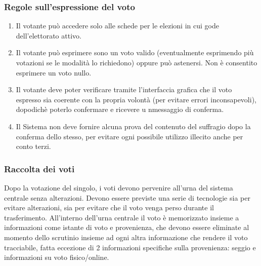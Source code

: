 \documentclass{report}
\begin{document}
\subsubsection{Regole sull'espressione del voto}
\begin{enumerate}
	\item Il votante può accedere solo alle schede per le elezioni in cui gode dell'elettorato attivo.
	\item Il votante può esprimere sono un voto valido (eventualmente esprimendo più votazioni se le modalità lo richiedono) oppure può astenersi. Non è consentito esprimere un voto nullo.
	\item Il votante deve poter verificare tramite l'interfaccia grafica che il voto espresso sia coerente con la propria volontà (per evitare errori inconsapevoli), dopodichè poterlo confermare e ricevere u nmessaggio di conferma.
	\item Il Sistema non deve fornire alcuna prova del contenuto del suffragio dopo la conferma dello stesso, per evitare ogni possibile utilizzo illecito anche per conto terzi.
\end{enumerate}

\subsubsection{Raccolta dei voti}
Dopo la votazione del singolo, i voti devono pervenire all'urna del sistema centrale senza alterazioni. Devono essere previste una serie di tecnologie sia per evitare alterazioni, sia per evitare che il voto venga perso durante il trasferimento. 
All'interno dell'urna centrale il voto è memorizzato insieme a informazioni come istante di voto e provenienza, che devono essere eliminate al momento dello scrutinio insieme ad ogni altra informazione che rendere il voto tracciabile, fatta eccezione di 2 informazioni specifiche sulla provenienza: seggio e informazioni su voto fisico/online.
\end{document}
